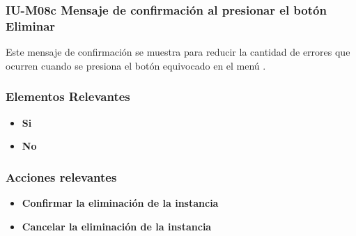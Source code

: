 
\subsubsection{IU-M08c Mensaje de confirmación al presionar el botón Eliminar}

 Este mensaje de confirmación se muestra para reducir la cantidad de errores que ocurren cuando se presiona el botón equivocado en el menú .


\subsubsection{Elementos Relevantes}

    \begin{itemize}
    \item {\bf Si}
    \item {\bf No}

    \end{itemize}

\subsubsection{Acciones relevantes}

    \begin{itemize}
    \item {\bf Confirmar la eliminación de la instancia}
    \item {\bf Cancelar la eliminación de la instancia}

    \end{itemize}

\clearpage
